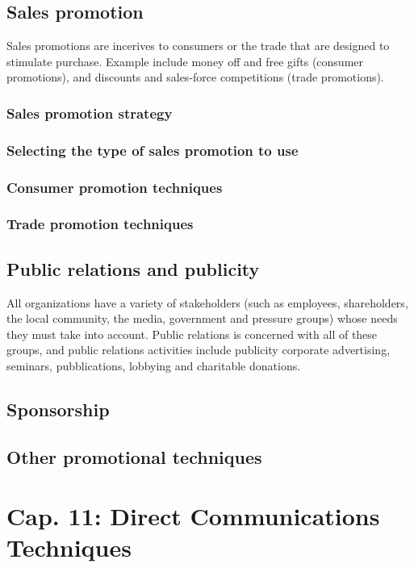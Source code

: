 \documentclass{article}
\begin{document}
\subsection{Sales promotion}
Sales promotions are incerives to consumers or the trade that are designed to stimulate purchase. Example include money off and free gifts (consumer promotions), and discounts and sales-force competitions (trade promotions).

\subsubsection*{Sales promotion strategy}
\subsubsection*{Selecting the type of sales promotion to use}
\subsubsection*{Consumer promotion techniques}
\subsubsection*{Trade promotion techniques}

\subsection{Public relations and publicity}
All organizations have a variety of stakeholders (such as employees, shareholders, the local community, the media, government and pressure groups) whose needs they must take into account. Public relations is concerned with all of these groups, and public relations activities include publicity corporate advertising, seminars, pubblications, lobbying and charitable donations. 

\subsection{Sponsorship}

\subsection{Other promotional techniques}

\section{Cap. 11: Direct Communications Techniques}
\end{document}
